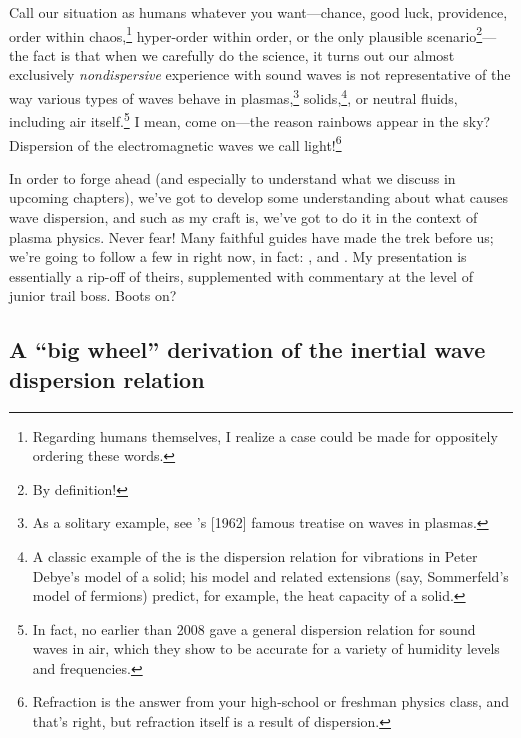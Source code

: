 Call our situation as humans whatever you want---chance, good luck, providence,
order within chaos,\footnote{Regarding humans themselves, I realize a case could
  be made for oppositely ordering these words.}  hyper-order within order, or
the only plausible scenario\footnote{By definition!}---the fact is that when we
carefully do the science, it turns out our almost exclusively
\emph{nondispersive} experience with sound waves is not representative of the
way various types of waves behave in plasmas,\footnote{As a solitary example,
  see \citeauthor{Stix1962}'s [1962] famous treatise on waves in plasmas.}
solids,\footnote{A classic example of the is the dispersion relation for
  vibrations in Peter Debye's model of a solid; his model and related extensions
  (say, Sommerfeld's model of fermions) predict, for example, the heat capacity
  of a solid.}, or neutral fluids, including air itself.\footnote{In fact, no
  earlier than 2008 \citeauthor{Alvarez2008} gave a general dispersion relation
  for sound waves in air, which they show to be accurate for a variety of
  humidity levels and frequencies.}  I mean, come on---the reason rainbows appear in
the sky?  Dispersion of the electromagnetic waves we call
light!\footnote{Refraction is the answer from your high-school or freshman
  physics class, and that's right, but refraction itself is a result of
  dispersion.}

In order to forge ahead (and especially to understand what we discuss in
upcoming chapters), we've got to develop some understanding about what causes
wave dispersion, and such as my craft is, we've got to do it in the context of
plasma physics. Never fear! Many faithful guides have made the trek before us;
we're going to follow a few in right now, in fact: \citet{Goertz1979}, and
\citet{Kletzing1994}. My presentation is essentially a rip-off of theirs,
supplemented with commentary at the level of junior trail boss. Boots on?

\subsection[A ``big wheel'' derivation of the IAW dispersion
relation]{A ``big wheel'' derivation of the inertial \Alf wave dispersion
  relation}

